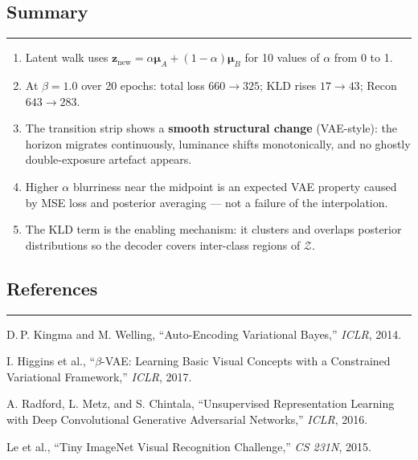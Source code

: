 \documentclass[11pt,a4paper]{article}
\begin{document}
\subsection*{Summary}
\noindent\rule{\linewidth}{0.4pt}

\begin{enumerate}[leftmargin=*, itemsep=2pt]
    \item Latent walk uses $\mathbf{z}_{\text{new}} = \alpha\boldsymbol{\mu}_A +
          (1-\alpha)\boldsymbol{\mu}_B$ for 10 values of $\alpha$ from 0 to 1.
    \item At $\beta = 1.0$ over 20 epochs: total loss $660 \to 325$;
          KLD rises $17 \to 43$; Recon $643 \to 283$.
    \item The transition strip shows a \textbf{smooth structural change} (VAE-style):
          the horizon migrates continuously, luminance shifts monotonically, and
          no ghostly double-exposure artefact appears.
    \item Higher $\alpha$ blurriness near the midpoint is an expected VAE property
          caused by MSE loss and posterior averaging --- not a failure of the interpolation.
    \item The KLD term is the enabling mechanism: it clusters and overlaps posterior
          distributions so the decoder covers inter-class regions of $\mathcal{Z}$.
\end{enumerate}

\subsection*{References}
\noindent\rule{\linewidth}{0.4pt}

\begin{enumerate}[label={[\arabic*]}, leftmargin=*, itemsep=1pt]
    \item D.\,P. Kingma and M. Welling, ``Auto-Encoding Variational Bayes,'' \textit{ICLR}, 2014.
    \item I. Higgins et al., ``$\beta$-VAE: Learning Basic Visual Concepts with a Constrained
          Variational Framework,'' \textit{ICLR}, 2017.
    \item A. Radford, L. Metz, and S. Chintala, ``Unsupervised Representation Learning with
          Deep Convolutional Generative Adversarial Networks,'' \textit{ICLR}, 2016.
    \item Le et al., ``Tiny ImageNet Visual Recognition Challenge,'' \textit{CS 231N}, 2015.
\end{enumerate}
\end{document}
